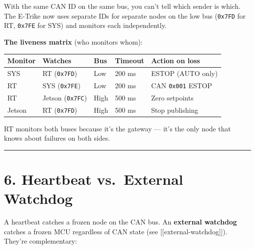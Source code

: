 \documentclass[12pt,a4paper,oneside]{report}
\begin{document}
With the same CAN ID on the same bus, you can't tell which sender is which. The
E-Trike now uses separate IDs for separate nodes on the low bus (\texttt{0x7FD}
for RT, \texttt{0x7FE} for SYS) and monitors each independently.

\textbf{The liveness matrix} (who monitors whom):

\begin{longtable}[]{@{}lllll@{}}
\toprule\noalign{}
Monitor & Watches & Bus & Timeout & Action on loss \\
\midrule\noalign{}
\endhead
\bottomrule\noalign{}
\endlastfoot
SYS & RT (\texttt{0x7FD}) & Low & 200 ms & ESTOP (AUTO only) \\
RT & SYS (\texttt{0x7FE}) & Low & 200 ms & CAN \texttt{0x001} ESTOP \\
RT & Jetson (\texttt{0x7FC}) & High & 500 ms & Zero setpoints \\
Jetson & RT (\texttt{0x7FD}) & High & 500 ms & Stop publishing \\
\end{longtable}

RT monitors both buses because it's the gateway --- it's the only node that
knows about failures on both sides.

\begin{center}\rule{0.5\linewidth}{0.5pt}\end{center}

\section{6. Heartbeat vs.~External
Watchdog}\label{heartbeat-vs.-external-watchdog}

A heartbeat catches a frozen node on the CAN bus. An \textbf{external watchdog}
catches a frozen MCU regardless of CAN state (see
{[}{[}external-watchdog{]}{]}). They're complementary:
\end{document}
